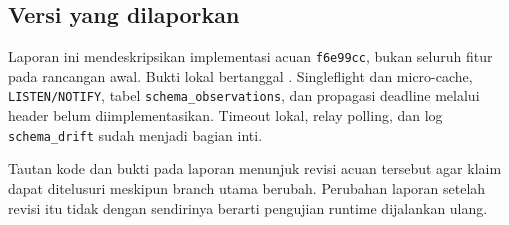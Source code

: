 \subsection{Versi yang dilaporkan}
Laporan ini mendeskripsikan implementasi acuan \texttt{f6e99cc}, bukan seluruh fitur pada rancangan awal. Bukti lokal bertanggal \EvidenceDate. Singleflight dan micro-cache, \texttt{LISTEN/NOTIFY}, tabel \texttt{schema\_observations}, dan propagasi deadline melalui header belum diimplementasikan. Timeout lokal, relay polling, dan log \texttt{schema\_drift} sudah menjadi bagian inti.

Tautan kode dan bukti pada laporan menunjuk revisi acuan tersebut agar klaim dapat ditelusuri meskipun branch utama berubah. Perubahan laporan setelah revisi itu tidak dengan sendirinya berarti pengujian runtime dijalankan ulang.
